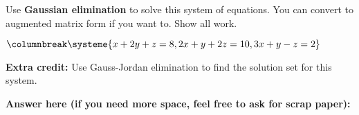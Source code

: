 \documentclass{exam}
\begin{document}
\begin{questions}
\begin{multicols}{2}
\end{multicols}

\newpage

\question
\begin{multicols}{2}
Use \textbf{Gaussian elimination} to solve this system of equations.  You can convert to augmented matrix form if you want to.  Show all work.


$
\columnbreak
\systeme{
x + 2y + z = 8,
2x + y    + 2z = 10,
3x + y - z = 2
}
$
\end{multicols}

\textbf{Extra credit: } Use Gauss-Jordan elimination to find the solution set for this system.

\textbf{Answer here (if you need more space, feel free to ask for scrap paper): }

\end{questions}

\thispagestyle{empty}
\end{document}
